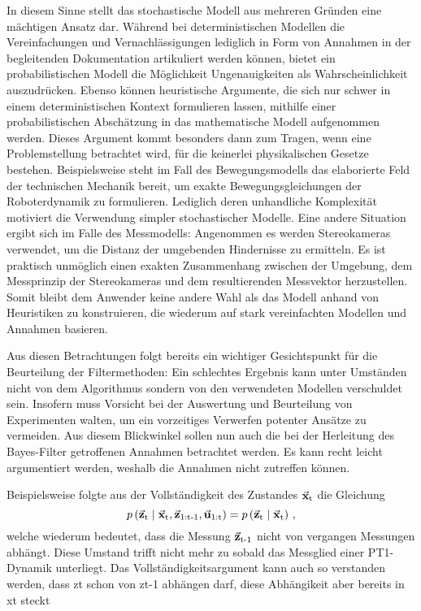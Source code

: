 In diesem Sinne stellt das stochastische Modell aus mehreren Gründen eine mächtigen Ansatz dar. Während bei deterministischen Modellen die Vereinfachungen und Vernachlässigungen lediglich in Form von Annahmen in der begleitenden Dokumentation artikuliert werden können, bietet ein probabilistischen Modell die Möglichkeit Ungenauigkeiten als Wahrscheinlichkeit auszudrücken. Ebenso können heuristische Argumente, die sich nur schwer in einem deterministischen Kontext formulieren lassen, mithilfe einer probabilistischen Abschätzung in das mathematische Modell aufgenommen werden. Dieses Argument kommt besonders dann zum Tragen, wenn eine Problemstellung betrachtet wird, für die keinerlei physikalischen Gesetze bestehen. Beispielsweise steht im Fall des Bewegungsmodells das elaborierte Feld der technischen Mechanik bereit, um exakte Bewegungsgleichungen der Roboterdynamik zu formulieren. Lediglich deren unhandliche Komplexität motiviert die Verwendung simpler stochastischer Modelle. Eine andere Situation ergibt sich im Falle des Messmodells: Angenommen es werden Stereokameras verwendet, um die Distanz der umgebenden Hindernisse zu ermitteln. Es ist praktisch unmöglich einen exakten Zusammenhang zwischen der Umgebung, dem Messprinzip der Stereokameras und dem resultierenden Messvektor herzustellen. Somit bleibt dem Anwender keine andere Wahl als das Modell anhand von Heuristiken zu konstruieren, die wiederum auf stark vereinfachten Modellen und Annahmen basieren. 

Aus diesen Betrachtungen folgt bereits ein wichtiger Gesichtspunkt für die Beurteilung der Filtermethoden: Ein schlechtes Ergebnis kann unter Umständen nicht von dem Algorithmus sondern von den verwendeten Modellen verschuldet sein. Insofern muss Vorsicht bei der Auswertung und Beurteilung von Experimenten walten, um ein vorzeitiges Verwerfen potenter Ansätze zu vermeiden. Aus diesem Blickwinkel sollen nun auch die bei der Herleitung des Bayes-Filter getroffenen Annahmen betrachtet werden. Es kann recht leicht argumentiert werden, weshalb die Annahmen nicht zutreffen können. 

Beispielsweise folgte aus der Vollständigkeit des Zustandes $\vec{\mathbf{x}}_{\text{t}}$ die Gleichung
\begin{equation}
p\left({\vec{\mathbf{z}}_{\text{t}}} \hspace{1mm} \vert \hspace{1mm} {\vec{\mathbf{x}}_{\text{t}},\vec{\mathbf{z}}_{\text{1:t-1}},\vec{\mathbf{u}}_{\text{1:t}}}\right) = p\left({\vec{\mathbf{z}}_{\text{t}}} \hspace{1mm} \vert \hspace{1mm} {\vec{\mathbf{x}}_{\text{t}}}\right)\,,
\end{equation}
welche wiederum bedeutet, dass die Messung $\vec{\mathbf{z}}_{\text{t-1}}$ nicht von vergangen Messungen abhängt. Diese Umstand trifft nicht mehr zu sobald das Messglied einer PT1-Dynamik unterliegt.
{\color{red} Das Vollständigkeitsargument kann auch so verstanden werden, dass zt schon von zt-1 abhängen darf, diese Abhängikeit aber bereits in xt steckt}

